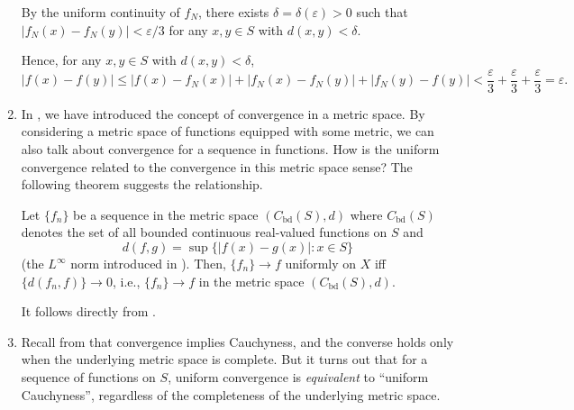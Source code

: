 \begin{enumerate}
\begin{pf}
By the uniform continuity of \(f_N\), there exists \(\delta=\delta(\varepsilon)>0\) such that
\(|f_N(x)-f_N(y)|<\varepsilon/3\) for any \(x,y\in S\) with \(d(x,y)<\delta\).

Hence, for any \(x,y\in S\) with \(d(x,y)<\delta\),
\[
|f(x)-f(y)|\le |f(x)-f_N(x)|+|f_N(x)-f_N(y)|+|f_N(y)-f(y)|
<\frac{\varepsilon}{3}+\frac{\varepsilon}{3}+\frac{\varepsilon}{3}
=\varepsilon.
\]
\end{pf}

\item In , we have introduced the concept of convergence
in a metric space. By considering a metric space of functions equipped with
some metric, we can also talk about convergence for a sequence in functions.
How is the uniform convergence related to the convergence in this metric space
sense? The following theorem suggests the relationship.

\begin{theorem}
\label{thm:unif-conv-ms-conv}
Let \(\{f_n\}\) be a sequence in the metric space \((C_{\mathrm{bd}}(S),d)\)
where \(C_{\mathrm{bd}}(S)\) denotes the set of all bounded continuous
real-valued functions on \(S\) and
\[
d(f,g)=\sup\{|f(x)-g(x)|:x\in S\}
\]
(the \(L^{\infty}\) norm introduced in ). Then,
\(\{f_n\}\to f\) uniformly on \(X\) iff \(\{d(f_n,f)\}\to 0\), i.e.,
\(\{f_n\}\to f\) in the metric space \((C_{\mathrm{bd}}(S),d)\).
\end{theorem}
\begin{pf}
It follows directly from .
\end{pf}


\item Recall from  that convergence implies
Cauchyness, and the converse holds only when the underlying metric space is
complete. But it turns out that for a sequence of functions on \(S\), uniform
convergence is \emph{equivalent} to ``uniform Cauchyness'', regardless of the
completeness of the underlying metric space.


\end{enumerate}
